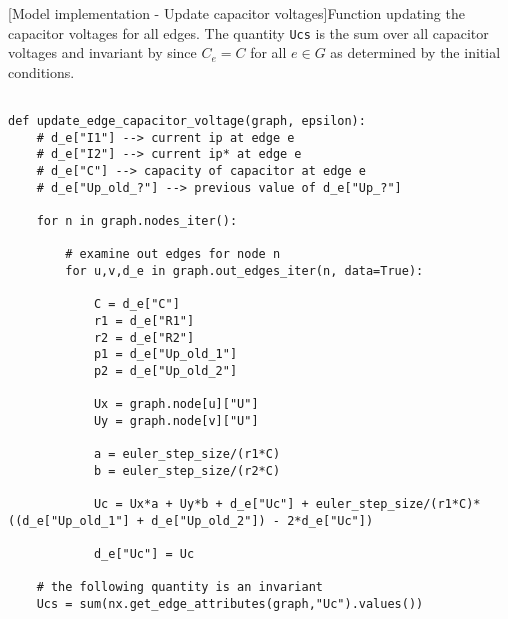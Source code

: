 \begin{codesnippet}
[Model implementation - Update capacitor voltages]{Function updating the capacitor voltages for all edges. The quantity \texttt{Ucs} is the sum over all capacitor voltages and invariant by  since $C_e = C$ for all $e \in G$ as determined by the initial conditions.}
\label{code:capacitor_voltage}
\begin{verbatim}

def update_edge_capacitor_voltage(graph, epsilon):
	# d_e["I1"] --> current ip at edge e
	# d_e["I2"] --> current ip* at edge e
	# d_e["C"] --> capacity of capacitor at edge e
	# d_e["Up_old_?"] --> previous value of d_e["Up_?"]
	
	for n in graph.nodes_iter():

		# examine out edges for node n
		for u,v,d_e in graph.out_edges_iter(n, data=True):

			C = d_e["C"]
			r1 = d_e["R1"]
			r2 = d_e["R2"]
			p1 = d_e["Up_old_1"]
			p2 = d_e["Up_old_2"]
						
			Ux = graph.node[u]["U"]
			Uy = graph.node[v]["U"]

			a = euler_step_size/(r1*C)
			b = euler_step_size/(r2*C)
			
			Uc = Ux*a + Uy*b + d_e["Uc"] + euler_step_size/(r1*C)*((d_e["Up_old_1"] + d_e["Up_old_2"]) - 2*d_e["Uc"]) 

			d_e["Uc"] = Uc

	# the following quantity is an invariant
	Ucs = sum(nx.get_edge_attributes(graph,"Uc").values())		
\end{verbatim}


\end{codesnippet}


